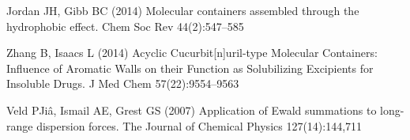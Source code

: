 \begin{thebibliography}{25}
Jordan JH, Gibb BC (2014) Molecular containers assembled through the
  hydrophobic effect. Chem Soc Rev 44(2):547--585

Zhang B, Isaacs L (2014) Acyclic {Cucurbit}[n]uril-type {Molecular}
  {Containers}: {Influence} of {Aromatic} {Walls} on their {Function} as
  {Solubilizing} {Excipients} for {Insoluble} {Drugs}. J Med Chem
  57(22):9554--9563

Veld PJiâ, Ismail AE, Grest GS (2007) Application of {Ewald} summations to
  long-range dispersion forces. The Journal of Chemical Physics 127(14):144,711

\end{thebibliography}





